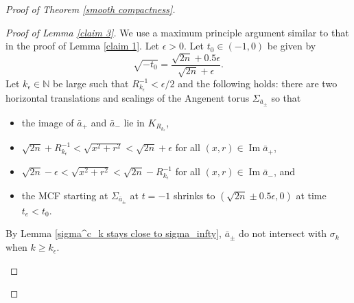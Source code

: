 \documentclass[12pt]{amsart}
\numberwithin{equation}{section}
\theoremstyle{remark}
\begin{document}
\begin{proof} [Proof of Theorem \ref{smooth compactness}]
		\begin{proof} [Proof of Lemma \ref{claim 3}] We use a maximum principle argument similar to that in the proof of Lemma \ref{claim 1}. Let $\epsilon>0$. Let $t_0 \in (-1, 0)$ be given by 
			\begin{equation} \label{eqn choice of t_0}
				\sqrt{-t_0} = \frac{\sqrt{2n} + 0.5\epsilon}{\sqrt{2n}+\epsilon}.
			\end{equation}
			Let $k_\epsilon \in \mathbb N$ be large such that $R_{k_\epsilon}^{-1}<\epsilon/2$ and the following holds: there are two horizontal translations and scalings of the Angenent torus $\Sigma_{\bar a_\pm}$ so that
			
			\begin{itemize}
				\item the image of $\bar a_+$ and $\bar a_-$ lie in $K_{R_{k_\epsilon}}$, 
				\item $\sqrt{2n}+R_{k_\epsilon}^{-1}< \sqrt{x^2+r^2} <\sqrt{2n}+\epsilon$ for all $(x, r) \in \operatorname{Im} \bar a_+$, 
				\item $\sqrt{2n}-\epsilon <\sqrt{x^2+r^2}<\sqrt{2n}-R_{k_\epsilon}^{-1}$ for all $(x, r) \in \operatorname{Im} \bar a_-$, and
				\item the MCF starting at $\Sigma_{\bar a_\pm}$ at $t=-1$ shrinks to $(\sqrt{2n} \pm 0.5\epsilon, 0)$ at time $t_e <t_0$. 
			\end{itemize}
			By Lemma \ref{sigma^c_k stays close to sigma_infty}, $\bar a_{\pm}$ do not intersect with $\sigma_k$ when $k\ge k_\epsilon$.
			\begin{figure}[ht]
				
				\begin{tikzpicture}[x=0.75pt,y=0.75pt,yscale=-1,xscale=1]
					

\end{tikzpicture}
\end{figure}
\end{proof}
\end{proof}
\end{document}
